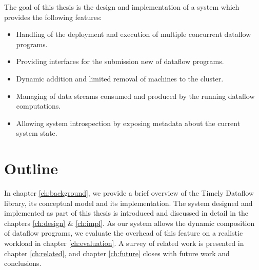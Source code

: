 The goal of this thesis is the design and implementation of a system which
provides the following features:

\begin{itemize}
\item Handling of the deployment and execution of multiple concurrent dataflow programs.
\item Providing interfaces for the submission new of dataflow programs.
\item Dynamic addition and limited removal of machines to the cluster.
\item Managing of data streams consumed and produced by the running dataflow computations.
\item Allowing system introspection by exposing metadata about the current system state.
\end{itemize}


\section{Outline}

In chapter \ref{ch:background}, we provide a brief overview of
the Timely Dataflow library, its conceptual model and its implementation. The
system designed and implemented as part of this thesis is introduced and
discussed in detail in the chapters \ref{ch:design} \& \ref{ch:impl}. As our
system allows the dynamic composition of dataflow programs, we evaluate the
overhead of this feature on a realistic workload in chapter \ref{ch:evaluation}.
A survey of related work is presented in chapter \ref{ch:related}, and chapter
\ref{ch:future} closes with future work and conclusions.
